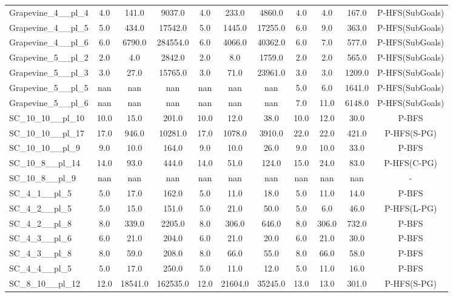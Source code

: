 \begin{table}[!ht]
\begin{tabular}{l|ccc|ccc|cccc}
Grapevine\_4\_\_pl\_4 & 4.0 & 141.0 & 9037.0 & 4.0 & 233.0 & 4860.0 & 4.0 & 4.0 & 167.0 & P-HFS(SubGoals) \\
Grapevine\_4\_\_pl\_5 & 5.0 & 434.0 & 17542.0 & 5.0 & 1445.0 & 17255.0 & 6.0 & 9.0 & 363.0 & P-HFS(SubGoals) \\
Grapevine\_4\_\_pl\_6 & 6.0 & 6790.0 & 284554.0 & 6.0 & 4066.0 & 40362.0 & 6.0 & 7.0 & 577.0 & P-HFS(SubGoals) \\
Grapevine\_5\_\_pl\_2 & 2.0 & 4.0 & 2842.0 & 2.0 & 8.0 & 1759.0 & 2.0 & 2.0 & 565.0 & P-HFS(SubGoals) \\
Grapevine\_5\_\_pl\_3 & 3.0 & 27.0 & 15765.0 & 3.0 & 71.0 & 23961.0 & 3.0 & 3.0 & 1209.0 & P-HFS(SubGoals) \\
Grapevine\_5\_\_pl\_5 & nan & nan & nan & nan & nan & nan & 5.0 & 6.0 & 1641.0 & P-HFS(SubGoals) \\
Grapevine\_5\_\_pl\_6 & nan & nan & nan & nan & nan & nan & 7.0 & 11.0 & 6148.0 & P-HFS(SubGoals) \\
SC\_10\_10\_\_pl\_10 & 10.0 & 15.0 & 201.0 & 10.0 & 12.0 & 38.0 & 10.0 & 12.0 & 30.0 & P-BFS \\
SC\_10\_10\_\_pl\_17 & 17.0 & 946.0 & 10281.0 & 17.0 & 1078.0 & 3910.0 & 22.0 & 22.0 & 421.0 & P-HFS(S-PG) \\
SC\_10\_10\_\_pl\_9 & 9.0 & 10.0 & 164.0 & 9.0 & 10.0 & 26.0 & 9.0 & 10.0 & 33.0 & P-BFS \\
SC\_10\_8\_\_pl\_14 & 14.0 & 93.0 & 444.0 & 14.0 & 51.0 & 124.0 & 15.0 & 24.0 & 83.0 & P-HFS(C-PG) \\
SC\_10\_8\_\_pl\_9 & nan & nan & nan & nan & nan & nan & nan & nan & nan & - \\
SC\_4\_1\_\_pl\_5 & 5.0 & 17.0 & 162.0 & 5.0 & 11.0 & 18.0 & 5.0 & 11.0 & 14.0 & P-BFS \\
SC\_4\_2\_\_pl\_5 & 5.0 & 15.0 & 151.0 & 5.0 & 21.0 & 50.0 & 5.0 & 6.0 & 46.0 & P-HFS(L-PG) \\
SC\_4\_2\_\_pl\_8 & 8.0 & 339.0 & 2205.0 & 8.0 & 306.0 & 646.0 & 8.0 & 306.0 & 732.0 & P-BFS \\
SC\_4\_3\_\_pl\_6 & 6.0 & 21.0 & 204.0 & 6.0 & 21.0 & 20.0 & 6.0 & 21.0 & 30.0 & P-BFS \\
SC\_4\_3\_\_pl\_8 & 8.0 & 59.0 & 208.0 & 8.0 & 66.0 & 55.0 & 8.0 & 66.0 & 58.0 & P-BFS \\
SC\_4\_4\_\_pl\_5 & 5.0 & 17.0 & 250.0 & 5.0 & 11.0 & 12.0 & 5.0 & 11.0 & 16.0 & P-BFS \\
SC\_8\_10\_\_pl\_12 & 12.0 & 18541.0 & 162535.0 & 12.0 & 21604.0 & 35245.0 & 13.0 & 13.0 & 301.0 & P-HFS(S-PG) \\

\end{tabular}
\end{table}
